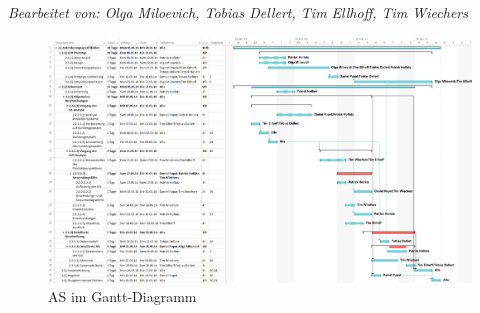 \documentclass[fontsize=12pt,paper=a4,twoside]{scrartcl}
\begin{document}
\textit{Bearbeitet von: Olga Miloevich, Tobias Dellert, Tim Ellhoff, Tim Wiechers}\\

\newpage
\begin{figure}[!h]
\includegraphics[angle = 90, scale=0.3]{gantt_as.jpg}
\caption{AS im Gantt-Diagramm}
\label{Gantt-AS}
\end{figure}
\newpage
\end{document}
